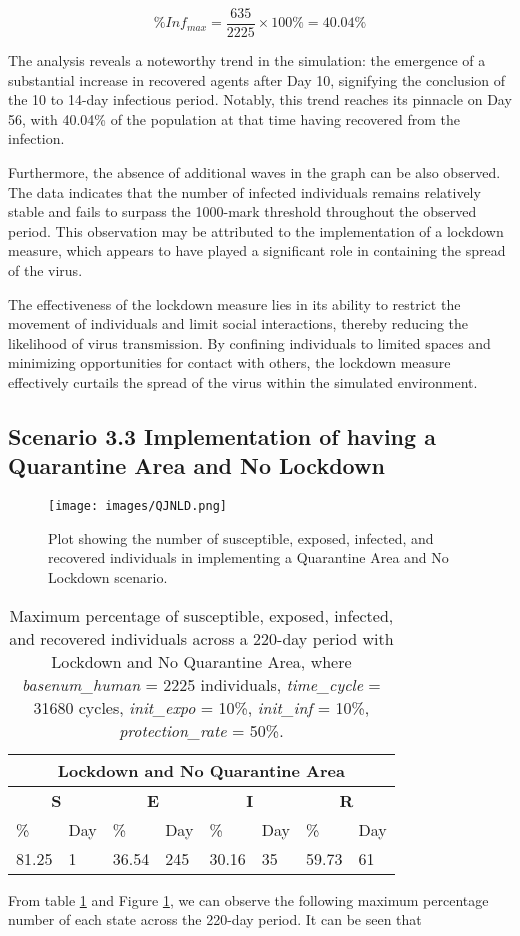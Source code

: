 \[ \%Inf_{max} = \frac{635}{2225} \times 100\%  = 40.04\%\]

The analysis reveals a noteworthy trend in the simulation: the emergence of a substantial increase in recovered agents after Day 10, signifying the conclusion of the 10 to 14-day infectious period. Notably, this trend reaches its pinnacle on Day 56, with 40.04\% of the population at that time having recovered from the infection.

Furthermore, the absence of additional waves in the graph can be also observed. The data indicates that the number of infected individuals remains relatively stable and fails to surpass the 1000-mark threshold throughout the observed period. This observation may be attributed to the implementation of a lockdown measure, which appears to have played a significant role in containing the spread of the virus.

The effectiveness of the lockdown measure lies in its ability to restrict the movement of individuals and limit social interactions, thereby reducing the likelihood of virus transmission. By confining individuals to limited spaces and minimizing opportunities for contact with others, the lockdown measure effectively curtails the spread of the virus within the simulated environment.

\subsection{ Scenario 3.3 Implementation of having a Quarantine Area and No Lockdown}
\label{3.3}
\begin{figure}[H]
\centering
\texttt{[image: images/QJNLD.png]}
\caption{Plot showing the number of susceptible, exposed, infected, and recovered individuals in implementing a Quarantine Area and No Lockdown scenario. }
\label{LD3} 
\end{figure}
\begin{table} [H]
\centering
\begin{tabular}{|l|l|l|l|l|l|l|l|}
	\hline
	\multicolumn{8}{|c|}{\textbf{Lockdown and No Quarantine Area}}\\
	\hline
	\multicolumn{2}{|c|}{\textbf{S}} &  \multicolumn{2}{|c|}{\textbf{E}}&  \multicolumn{2}{|c|}{\textbf{I}}&  \multicolumn{2}{|c|}{\textbf{R}}\\
	\hline
	\%& Day & \% & Day & \%  & Day & \% & Day \\
	\hline
	81.25& 1 &36.54& 245&  30.16& 35& 59.73&61\\
	\hline
\end{tabular}
\caption{Maximum percentage of susceptible, exposed, infected, and recovered individuals across a 220-day period with Lockdown and No Quarantine Area, where \textit{basenum\_human} = 2225 individuals, \textit{time\_cycle} = 31680 cycles, \textit{init\_expo} = 10\%, \textit{init\_inf} = 10\%,  \textit{protection\_rate} = 50\%.}
\label{LD3_Max}
\end{table}
From table \ref{LD3_Max} and Figure \ref{LD3}, we can observe the following maximum percentage number of each state across the 220-day period. It can be seen that 

